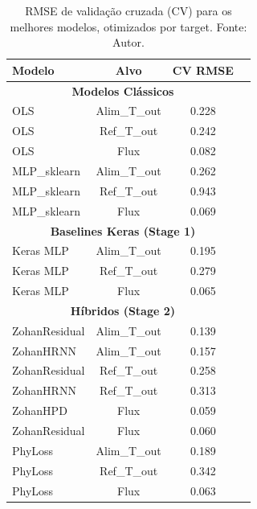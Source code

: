 \begin{table}[H]
\centering
\caption[RMSE de validação cruzada]{RMSE de validação cruzada (CV) para os melhores modelos, otimizados por target. Fonte: Autor.}
\label{tab:cv_rmse_all}
\begin{tabular}{l c c c}
\hline
\textbf{Modelo} & \textbf{Alvo} & \textbf{CV RMSE} \\
\hline
\multicolumn{3}{c}{\textbf{Modelos Clássicos}} \\
\hline
OLS & Alim\_T\_out & 0.228 \\
OLS & Ref\_T\_out & 0.242 \\
OLS & Flux & 0.082 \\
MLP\_sklearn & Alim\_T\_out & 0.262 \\
MLP\_sklearn & Ref\_T\_out & 0.943 \\
MLP\_sklearn & Flux & 0.069 \\
\hline
\multicolumn{3}{c}{\textbf{Baselines Keras (Stage 1)}} \\
\hline
Keras MLP & Alim\_T\_out & 0.195 \\
Keras MLP & Ref\_T\_out & 0.279 \\
Keras MLP & Flux & 0.065 \\
\hline
\multicolumn{3}{c}{\textbf{Híbridos (Stage 2)}} \\
\hline
ZohanResidual & Alim\_T\_out & 0.139 \\
ZohanHRNN & Alim\_T\_out & 0.157 \\
ZohanResidual & Ref\_T\_out & 0.258 \\
ZohanHRNN & Ref\_T\_out & 0.313 \\
ZohanHPD & Flux & 0.059 \\
ZohanResidual & Flux & 0.060 \\
PhyLoss & Alim\_T\_out & 0.189 \\
PhyLoss & Ref\_T\_out & 0.342 \\
PhyLoss & Flux & 0.063 \\
\hline
\end{tabular}
\end{table}

